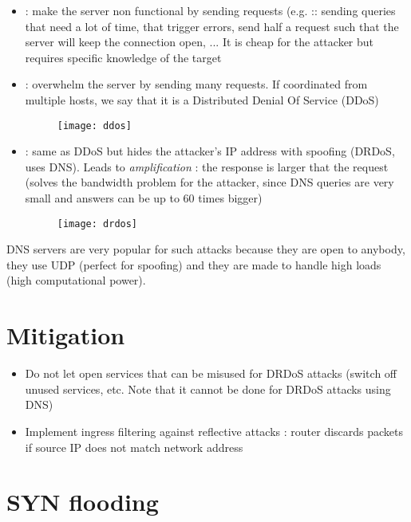\begin{itemize}
    \item {} : make the server non functional by sending requests (e.g. :: sending queries that need a lot of time, that trigger errors, send half a request such that the server will keep the connection open, ... It is cheap for the attacker but requires specific knowledge of the target
    \item {} : overwhelm the server by sending many requests. If coordinated from multiple hosts, we say that it is a Distributed Denial Of Service (DDoS) 
    \begin{figure}[H]
        \centering
        \texttt{[image: ddos]}
    \end{figure}
    \item {} : same as DDoS but hides the attacker's IP address with spoofing (DRDoS, uses DNS). Leads to \textit{amplification} : the response is larger that the request (solves the bandwidth problem for the attacker, since DNS queries are very small and answers can be up to 60 times bigger)
    \begin{figure}[H]
        \centering
        \texttt{[image: drdos]}
    \end{figure}
\end{itemize}

DNS servers are very popular for such attacks because they are open to anybody, they use UDP (perfect for spoofing) and they are made to handle high loads (high computational power).

\section{Mitigation}

\begin{itemize}
    \item Do not let open services that can be misused for DRDoS attacks (switch off unused services, etc. Note that it cannot be done for DRDoS attacks using DNS)
    \item Implement ingress filtering against reflective attacks : router discards packets if source IP does not match network address
\end{itemize}

\section{SYN flooding}

